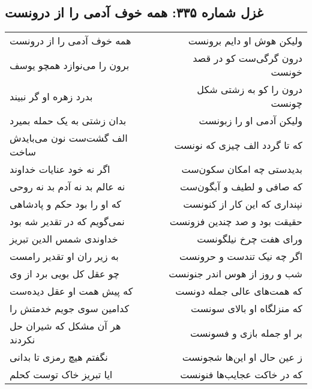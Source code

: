 \begin{center}
\section*{غزل شماره ۳۳۵: همه خوف آدمی را از درونست}
\label{sec:0335}
\begin{longtable}{l p{0.5cm} r}
همه خوف آدمی را از درونست
&&
ولیکن هوش او دایم برونست
\\
برون را می‌نوازد همچو یوسف
&&
درون گرگی‌ست کو در قصد خونست
\\
بدرد زهره او گر نبیند
&&
درون را کو به زشتی شکل چونست
\\
بدان زشتی به یک حمله بمیرد
&&
ولیکن آدمی او را زبونست
\\
الف گشت‌ست نون می‌بایدش ساخت
&&
که تا گردد الف چیزی که نونست
\\
اگر نه خود عنایات خداوند
&&
بدیدستی چه امکان سکون‌ست
\\
نه عالم بد نه آدم بد نه روحی
&&
که صافی و لطیف و آبگون‌ست
\\
که او را بود حکم و پادشاهی
&&
نپنداری که این کار از کنونست
\\
نمی‌گویم که در تقدیر شه بود
&&
حقیقت بود و صد چندین فزونست
\\
خداوندی شمس الدین تبریز
&&
ورای هفت چرخ نیلگونست
\\
به زیر ران او تقدیر رامست
&&
اگر چه نیک تندست و حرونست
\\
چو عقل کل بویی برد از وی
&&
شب و روز از هوس اندر جنونست
\\
که پیش همت او عقل دیده‌ست
&&
که همت‌های عالی جمله دونست
\\
کدامین سوی جویم خدمتش را
&&
که منزلگاه او بالای سونست
\\
هر آن مشکل که شیران حل نکردند
&&
بر او جمله بازی و فسونست
\\
نگفتم هیچ رمزی تا بدانی
&&
ز عین حال او این‌ها شجونست
\\
ایا تبریز خاک توست کحلم
&&
که در خاکت عجایب‌ها فنونست
\\
\end{longtable}
\end{center}

